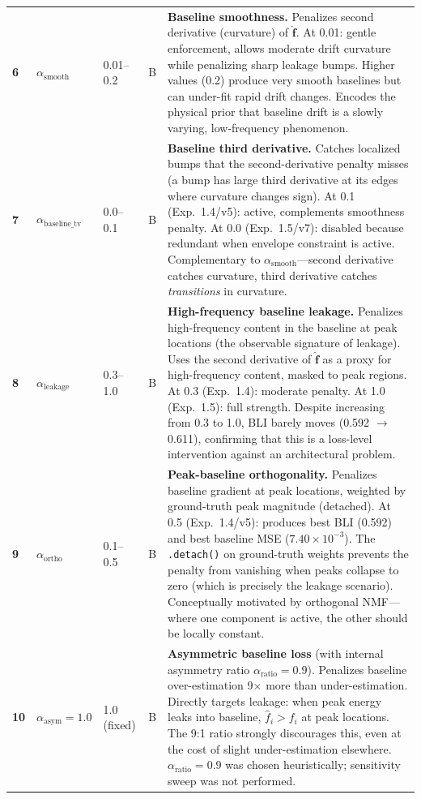 \documentclass[11pt, letterpaper]{article}
\begin{document}
{\begin{longtable}{@{} >{\bfseries}p{0.8cm} p{3.2cm} p{2.2cm} p{1.5cm} p{6.5cm} @{}}
6 & $\alpha_{\text{smooth}}$ & 0.01--0.2 & B &
\textbf{Baseline smoothness.} Penalizes second derivative (curvature) of $\hat{\mathbf{f}}$.
At 0.01: gentle enforcement, allows moderate drift curvature while penalizing sharp leakage bumps.
Higher values (0.2) produce very smooth baselines but can under-fit rapid drift changes.
Encodes the physical prior that baseline drift is a slowly varying, low-frequency phenomenon. \\

7 & $\alpha_{\text{baseline\_tv}}$ & 0.0--0.1 & B &
\textbf{Baseline third derivative.} Catches localized bumps that the second-derivative penalty misses
(a bump has large third derivative at its edges where curvature changes sign).
At 0.1 (Exp.~1.4/v5): active, complements smoothness penalty.
At 0.0 (Exp.~1.5/v7): disabled because redundant when envelope constraint is active.
Complementary to $\alpha_{\text{smooth}}$---second derivative catches curvature, third derivative
catches \emph{transitions} in curvature. \\

8 & $\alpha_{\text{leakage}}$ & 0.3--1.0 & B &
\textbf{High-frequency baseline leakage.} Penalizes high-frequency content in the baseline at peak
locations (the observable signature of leakage).
Uses the second derivative of $\hat{\mathbf{f}}$ as a proxy for high-frequency content, masked to peak
regions.
At 0.3 (Exp.~1.4): moderate penalty.  At 1.0 (Exp.~1.5): full strength.
Despite increasing from 0.3 to 1.0, BLI barely moves (0.592 $\to$ 0.611), confirming that this is a
loss-level intervention against an architectural problem. \\

9 & $\alpha_{\text{ortho}}$ & 0.1--0.5 & B &
\textbf{Peak-baseline orthogonality.} Penalizes baseline gradient at peak locations, weighted by
ground-truth peak magnitude (detached).
At 0.5 (Exp.~1.4/v5): produces best BLI (0.592) and best baseline MSE ($7.40 \times 10^{-3}$).
The \texttt{.detach()} on ground-truth weights prevents the penalty from vanishing when peaks collapse
to zero (which is precisely the leakage scenario).
Conceptually motivated by orthogonal NMF---where one component is active, the other should be locally
constant. \\

10 & $\alpha_{\text{asym}} = 1.0$ & 1.0 (fixed) & B &
\textbf{Asymmetric baseline loss} (with internal asymmetry ratio $\alpha_{\text{ratio}} = 0.9$).
Penalizes baseline over-estimation 9$\times$ more than under-estimation.
Directly targets leakage: when peak energy leaks into baseline, $\hat{f}_i > f_i$ at peak locations.
The 9:1 ratio strongly discourages this, even at the cost of slight under-estimation elsewhere.
$\alpha_{\text{ratio}} = 0.9$ was chosen heuristically; sensitivity sweep was not performed. \\


\end{longtable}}
\end{document}

